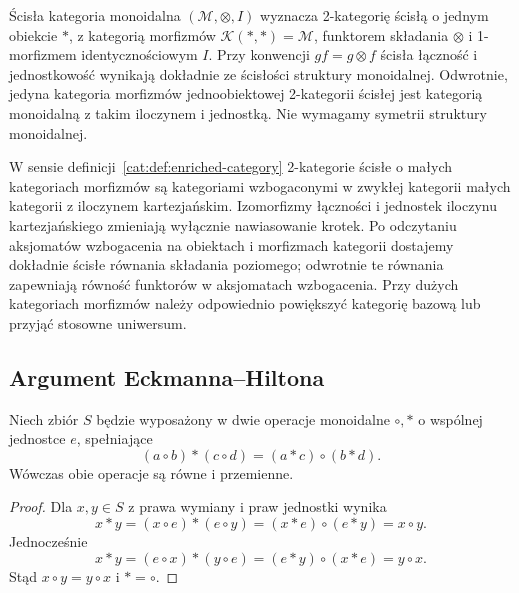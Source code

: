 \begin{przyklad}\label{cat:ex:two-one-object}
Ścisła kategoria monoidalna $(\mathcal M,\otimes,I)$ wyznacza 2-kategorię ścisłą o jednym obiekcie $*$, z kategorią morfizmów $\mathcal K(*,*)=\mathcal M$, funktorem składania $\otimes$ i 1-morfizmem identycznościowym $I$. Przy konwencji $gf=g\otimes f$ ścisła łączność i jednostkowość wynikają dokładnie ze ścisłości struktury monoidalnej. Odwrotnie, jedyna kategoria morfizmów jednoobiektowej 2-kategorii ścisłej jest kategorią monoidalną z takim iloczynem i jednostką. Nie wymagamy symetrii struktury monoidalnej.
\end{przyklad}

\begin{uwaga}
W sensie definicji~\ref{cat:def:enriched-category} 2-kategorie ścisłe o małych kategoriach morfizmów są kategoriami wzbogaconymi w zwykłej kategorii małych kategorii z iloczynem kartezjańskim. Izomorfizmy łączności i jednostek iloczynu kartezjańskiego zmieniają wyłącznie nawiasowanie krotek. Po odczytaniu aksjomatów wzbogacenia na obiektach i morfizmach kategorii dostajemy dokładnie ścisłe równania składania poziomego; odwrotnie te równania zapewniają równość funktorów w aksjomatach wzbogacenia. Przy dużych kategoriach morfizmów należy odpowiednio powiększyć kategorię bazową lub przyjąć stosowne uniwersum.
\end{uwaga}

\subsection{Argument Eckmanna--Hiltona}

\begin{twierdzenie}\label{cat:thm:eckmann-hilton}
Niech zbiór $S$ będzie wyposażony w dwie operacje monoidalne $\circ,\ast$ o wspólnej jednostce $e$, spełniające
\[
 (a\circ b)\ast(c\circ d)=(a\ast c)\circ(b\ast d).
\]
Wówczas obie operacje są równe i przemienne.
\end{twierdzenie}
\begin{proof}
Dla $x,y\in S$ z prawa wymiany i praw jednostki wynika
\[
 x\ast y=(x\circ e)\ast(e\circ y)
 =(x\ast e)\circ(e\ast y)=x\circ y.
\]
Jednocześnie
\[
 x\ast y=(e\circ x)\ast(y\circ e)
 =(e\ast y)\circ(x\ast e)=y\circ x.
\]
Stąd $x\circ y=y\circ x$ i $\ast=\circ$.
\end{proof}

